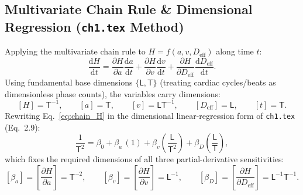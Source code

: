 \documentclass[11pt,a4paper]{article}
\newcommand{\dd}{\mathrm{d}}
\newcommand{\pd}[2]{\frac{\partial #1}{\partial #2}}
\newcommand{\td}[2]{\frac{\dd #1}{\dd #2}}
\newcommand{\dimbr}[1]{\left[#1\right]}
\newcommand{\Deff}{D_{\mathrm{eff}}}
\begin{document}
\subsection{Multivariate Chain Rule \& Dimensional Regression (\texttt{ch1.tex} Method)}
Applying the multivariate chain rule to $H = f(a, v, \Deff)$ along time $t$:
\begin{equation}
  \td{H}{t} = \pd{H}{a}\td{a}{t} + \pd{H}{v}\td{v}{t} + \pd{H}{\Deff}\td{\Deff}{t}.
  \label{eq:chain_H}
\end{equation}
Using fundamental base dimensions $\{\mathsf{L}, \mathsf{T}\}$ (treating cardiac cycles/beats as dimensionless phase counts), the variables carry dimensions:
\[
  \dimbr{H} = \mathsf{T}^{-1}, \qquad \dimbr{a} = \mathsf{T}, \qquad \dimbr{v} = \mathsf{L}\mathsf{T}^{-1}, \qquad \dimbr{\Deff} = \mathsf{L}, \qquad \dimbr{t} = \mathsf{T}.
\]
Rewriting Eq.~\eqref{eq:chain_H} in the dimensional linear-regression form of \texttt{ch1.tex} (Eq.~2.9):
\begin{equation}
  \frac{1}{\mathsf{T}^2} = \beta_0 + \beta_a\,(1) + \beta_v\left(\frac{\mathsf{L}}{\mathsf{T}^2}\right) + \beta_D\left(\frac{\mathsf{L}}{\mathsf{T}}\right),
\end{equation}
which fixes the required dimensions of all three partial-derivative sensitivities:
\begin{equation}
  \dimbr{\beta_a} = \dimbr{\pd{H}{a}} = \mathsf{T}^{-2}, \qquad
  \dimbr{\beta_v} = \dimbr{\pd{H}{v}} = \mathsf{L}^{-1}, \qquad
  \dimbr{\beta_D} = \dimbr{\pd{H}{\Deff}} = \mathsf{L}^{-1}\mathsf{T}^{-1}.
  \label{eq:beta_dims}
\end{equation}
\end{document}

